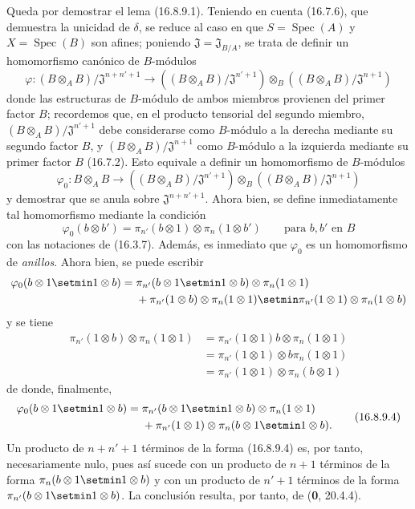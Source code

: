 Queda por demostrar el lema (16.8.9.1). Teniendo en cuenta (16.7.6), que
demuestra la unicidad de $\delta$, se reduce al caso en que
$S=\operatorname{Spec}(A)$ y $X=\operatorname{Spec}(B)$ son afines; poniendo
$\mathfrak{J}=\mathfrak{J}_{B/A}$, se trata de definir un homomorfismo
canónico de $B$-módulos
\[
  \varphi:(B\otimes_A B)/\mathfrak{J}^{n+n'+1}
  \longrightarrow
  ((B\otimes_A B)/\mathfrak{J}^{n'+1})
  \otimes_B((B\otimes_A B)/\mathfrak{J}^{n+1})
\]
donde las estructuras de $B$-módulo de ambos miembros provienen del
primer factor $B$; recordemos que, en el producto tensorial del segundo
miembro, $(B\otimes_A B)/\mathfrak{J}^{n'+1}$ debe considerarse
como $B$-módulo a la derecha mediante su segundo factor $B$, y
$(B\otimes_A B)/\mathfrak{J}^{n+1}$ como $B$-módulo a la izquierda
mediante su primer factor $B$ (16.7.2). Esto equivale a definir un
homomorfismo de $B$-módulos
\[
  \varphi_0:B\otimes_A B\longrightarrow
  ((B\otimes_A B)/\mathfrak{J}^{n'+1})
  \otimes_B((B\otimes_A B)/\mathfrak{J}^{n+1})
\]
y demostrar que se anula sobre $\mathfrak{J}^{n+n'+1}$. Ahora bien, se
define inmediatamente tal homomorfismo mediante la condición
\[
  \varphi_0(b\otimes b')
  =\pi_{n'}(b\otimes1)\otimes\pi_n(1\otimes b')
  \qquad\text{para $b,b'$ en $B$}
\]
con las notaciones de (16.3.7). Además, es inmediato que $\varphi_0$ es un
homomorfismo de \emph{anillos}. Ahora bien, se puede escribir
\[
  \begin{aligned}
  \varphi_0(b\otimes1\setmin 1\otimes b)
  ={}&\pi_{n'}(b\otimes1\setmin 1\otimes b)\otimes\pi_n(1\otimes1)\\
  &+\pi_{n'}(1\otimes b)\otimes\pi_n(1\otimes1)
  \setmin\pi_{n'}(1\otimes1)\otimes\pi_n(1\otimes b)
  \end{aligned}
\]
y se tiene
\[
  \begin{aligned}
  \pi_{n'}(1\otimes b)\otimes\pi_n(1\otimes1)
  &=\pi_{n'}(1\otimes1)b\otimes\pi_n(1\otimes1)\\
  &=\pi_{n'}(1\otimes1)\otimes b\pi_n(1\otimes1)\\
  &=\pi_{n'}(1\otimes1)\otimes\pi_n(b\otimes1)
  \end{aligned}
\]
de donde, finalmente,
\[
  \begin{aligned}
  \varphi_0(b\otimes1\setmin 1\otimes b)
  ={}&\pi_{n'}(b\otimes1\setmin 1\otimes b)\otimes\pi_n(1\otimes1)\\
  &+\pi_{n'}(1\otimes1)\otimes\pi_n(b\otimes1\setmin 1\otimes b).
  \end{aligned}
  \tag{16.8.9.4}
  \label{IV.16.8.9.4}
\]
Un producto de $n+n'+1$ términos de la forma (16.8.9.4) es, por tanto,
necesariamente nulo, pues así sucede con un producto de $n+1$ términos de la
forma $\pi_n(b\otimes1\setmin 1\otimes b)$ y con un producto de $n'+1$ términos de
la forma $\pi_{n'}(b\otimes1\setmin 1\otimes b)$. La conclusión resulta, por tanto,
de (\textbf 0, 20.4.4).

